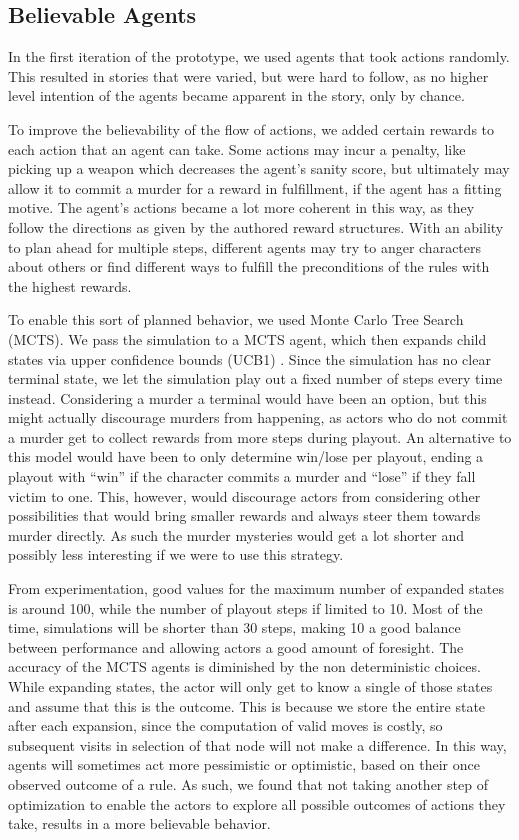 \subsection{Believable Agents}
In the first iteration of the prototype, we used agents that took actions randomly. This resulted in stories that were varied, but were hard to follow, as no higher level intention of the agents became apparent in the story, only by chance.

To improve the believability of the flow of actions, we added certain rewards to each action that an agent can take. Some actions may incur a penalty, like picking up a weapon which decreases the agent's sanity score, but ultimately may allow it to commit a murder for a reward in fulfillment, if the agent has a fitting motive. The agent's actions became a lot more coherent in this way, as they follow the directions as given by the authored reward structures. With an ability to plan ahead for multiple steps, different agents may try to anger characters about others or find different ways to fulfill the preconditions of the rules with the highest rewards. 

To enable this sort of planned behavior, we used Monte Carlo Tree Search (MCTS).
We pass the simulation to a MCTS agent, which then expands child states via upper confidence bounds (UCB1) .
Since the simulation has no clear terminal state, we let the simulation play out a fixed number of steps every time instead.
Considering a murder a terminal would have been an option, but this might actually discourage murders from happening, as actors who do not commit a murder get to collect rewards from more steps during playout.
An alternative to this model would have been to only determine win/lose per playout, ending a playout with \enquote{win} if the character commits a murder and \enquote{lose} if they fall victim to one.
This, however, would discourage actors from considering other possibilities that would bring smaller rewards and always steer them towards murder directly.
As such the murder mysteries would get a lot shorter and possibly less interesting if we were to use this strategy.

From experimentation, good values for the maximum number of expanded states is around 100, while the number of playout steps if limited to 10.
Most of the time, simulations will be shorter than 30 steps, making 10 a good balance between performance and allowing actors a good amount of foresight.
The accuracy of the MCTS agents is diminished by the non deterministic choices.
While expanding states, the actor will only get to know a single of those states and assume that this is the outcome.
This is because we store the entire state after each expansion, since the computation of valid moves is costly, so subsequent visits in selection of that node will not make a difference.
In this way, agents will sometimes act more pessimistic or optimistic, based on their once observed outcome of a rule.
As such, we found that not taking another step of optimization to enable the actors to explore all possible outcomes of actions they take, results in a more believable behavior.

